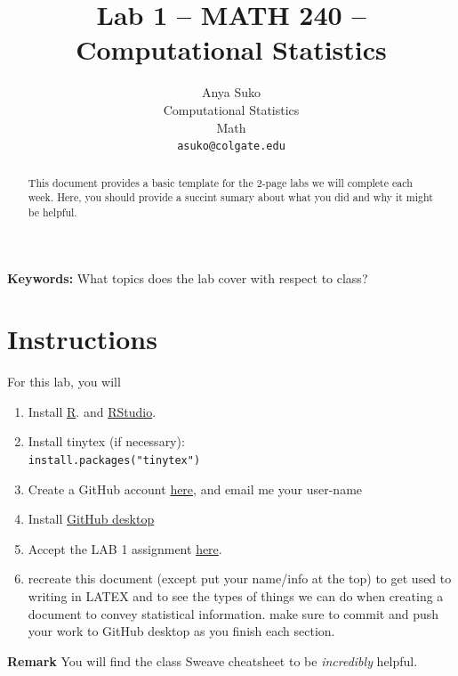 \documentclass{article}\usepackage[]{graphicx}\usepackage[]{xcolor}
\begin{document}
\vspace{-1in}
\title{Lab 1 -- MATH 240 -- Computational Statistics}

\author{
  Anya Suko \\
  Computational Statistics  \\
  Math  \\
  {\tt asuko@colgate.edu}
}

\date{}

\maketitle

\begin{multicols}{2}
\begin{abstract}
This document provides a basic template for the 2-page labs we will complete each week. Here, you should provide a succint sumary about what you did and why it might be helpful. 
\end{abstract}

\noindent \textbf{Keywords:} What topics does the lab cover with respect to class? 

\section{Instructions}
For this lab, you will
\begin{enumerate}[1.]\itemsep0em
  \item Install \href{https://cran.r-project.org/bin/windows/base/}{R}. and \href{https://posit.co/download/rstudio-desktop/}{RStudio}.
  \item Install tinytex (if necessary): \\ \texttt{install.packages("tinytex")}
  \item Create a GitHub account \href{https://github.com/}{here}, and email me your user-name
  \item Install \href{https://desktop.github.com/}{GitHub desktop}
  \item Accept the LAB 1 assignment \href{https://classroom.github.com/a/gfC_xMMl}{here}.
  \item recreate this document (except put your name/info at the top) to get used to writing in LATEX and to see the types of things we can do when creating a document to convey statistical information. make sure to commit and push your work to GitHub desktop as you finish each section.
\end{enumerate}

\noindent\textbf{Remark}
\noindent You will find the class Sweave cheatsheet to be \emph{incredibly} helpful.


\end{multicols}
\end{document}
